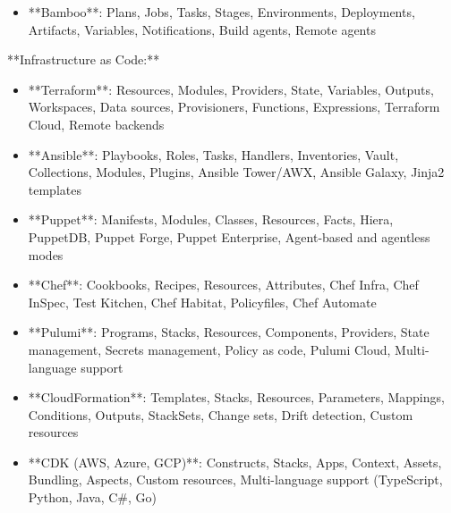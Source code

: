 \documentclass[11pt,a4paper]{article}
\begin{document}
\begin{itemize}
\item **Bamboo**: Plans, Jobs, Tasks, Stages, Environments, Deployments, Artifacts, Variables, Notifications, Build agents, Remote agents
\end{itemize}

**Infrastructure as Code:**

\begin{itemize}
\item **Terraform**: Resources, Modules, Providers, State, Variables, Outputs, Workspaces, Data sources, Provisioners, Functions, Expressions, Terraform Cloud, Remote backends
\end{itemize}

\begin{itemize}
\item **Ansible**: Playbooks, Roles, Tasks, Handlers, Inventories, Vault, Collections, Modules, Plugins, Ansible Tower/AWX, Ansible Galaxy, Jinja2 templates
\end{itemize}

\begin{itemize}
\item **Puppet**: Manifests, Modules, Classes, Resources, Facts, Hiera, PuppetDB, Puppet Forge, Puppet Enterprise, Agent-based and agentless modes
\end{itemize}

\begin{itemize}
\item **Chef**: Cookbooks, Recipes, Resources, Attributes, Chef Infra, Chef InSpec, Test Kitchen, Chef Habitat, Policyfiles, Chef Automate
\end{itemize}

\begin{itemize}
\item **Pulumi**: Programs, Stacks, Resources, Components, Providers, State management, Secrets management, Policy as code, Pulumi Cloud, Multi-language support
\end{itemize}

\begin{itemize}
\item **CloudFormation**: Templates, Stacks, Resources, Parameters, Mappings, Conditions, Outputs, StackSets, Change sets, Drift detection, Custom resources
\end{itemize}

\begin{itemize}
\item **CDK (AWS, Azure, GCP)**: Constructs, Stacks, Apps, Context, Assets, Bundling, Aspects, Custom resources, Multi-language support (TypeScript, Python, Java, C#, Go)
\end{itemize}
\end{document}
